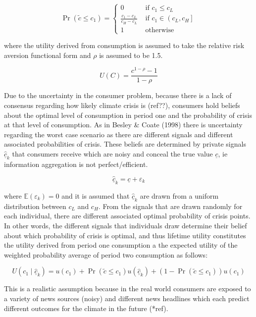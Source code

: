 \documentclass[11pt,preprint, authoryear]{elsarticle}
\numberwithin{equation}{section}
\numberwithin{figure}{section}
\numberwithin{table}{section}
\begin{document}
\[
\operatorname{Pr}\left(\tilde{c} \leq c_1\right)=\left\{\begin{array}{cc}
0 & \text { if } c_1 \leq c_L \\
\frac{c_1-c_L}{c_H-c_L} & \text { if } c_1 \in\left(c_L, c_H\right] \\
1 & \text { otherwise }
\end{array}\right.
\]

where the utility derived from consumption is assumed to take the
relative risk aversion functional form and \(\rho\) is assumed to be
1.5.

\[
U(C)=\frac{c^{1-\rho}-1}{1-\rho}
\]

Due to the uncertainty in the consumer problem, because there is a lack
of consensus regarding how likely climate crisis is (ref??), consumers
hold beliefs about the optimal level of consumption in period one and
the probability of crisis at that level of consumption. As in Besley \&
Coate (1998) there is uncertainty regarding the worst case scenario as
there are different signals and different associated probabilities of
crisis. These beliefs are determined by private signals
\(\hat{\underline{c}}_k\) that consumers receive which are noisy and
conceal the true value \(\underline{c}\), ie information aggregation is
not perfect/efficient.

\[
\hat{\underline{c}}_k=\underline{c}+\varepsilon_k
\]

where \(\mathbb{E}\left(\varepsilon_k\right)=0\) and it is assumed that
\(\hat{\underline{c}}_k\) are drawn from a uniform distribution between
\(c_L\) and \(c_H\). From the signals that are drawn randomly for each
individual, there are different associated optimal probability of crisis
points. In other words, the different signals that individuals draw
determine their belief about which probability of crisis is optimal, and
thus lifetime utility constitutes the utility derived from period one
consumption a the expected utility of the weighted probability average
of period two consumption as follows:

\[
U\left(c_1 \mid \hat{\underline{c}}_{k}\right)=u\left(c_1\right)+\operatorname{Pr}\left(\tilde{c} \leq c_1\right) u\left(\hat{\underline{c}}_{k}\right)+\left(1-\operatorname{Pr}\left(\tilde{c} \leq c_1\right)\right) u\left(c_1\right)
\]

This is a realistic assumption because in the real world consumers are
exposed to a variety of news sources (noisy) and different news
headlines which each predict different outcomes for the climate in the
future (*ref).
\end{document}
